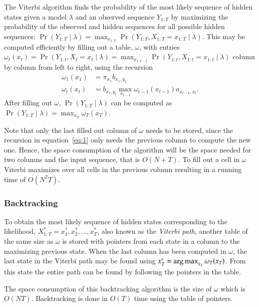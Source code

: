The Viterbi algorithm finds the probability of the most likely sequence of
hidden states given a model $\lambda$ and an observed sequence $Y_{1:T}$ by
maximizing the probability of the observed and hidden sequences for all
possible hidden sequences: $\Pr(Y_{1:T} \mid \lambda) = \max_{x_{1:T}}
\Pr(Y_{1:T}, X_{1:T} = x_{1:T} \mid \lambda)$. This may be computed efficiently
by filling out a table, $\omega$, with entries $\omega_t(x_t) = \Pr(Y_{1:t},
X_t = x_t \mid \lambda) = \max_{x_{1:t-1}} \Pr(Y_{1:t}, X_{1:t} = x_{1:t} \mid
\lambda)$ column by column from left to right, using the recursion
\begin{equation}
  \label{eq:1}
  \begin{aligned}
    \omega_1(x_1) &= \pi_{x_1} b_{x_1, y_1} \\
    \omega_t(x_t) &= b_{x_t, y_t} \max_{x_{t - 1}} \omega_{t - 1}(x_{t - 1})
    a_{x_{t - 1}, x_t}.
  \end{aligned}
\end{equation}
After filling out $\omega$, $\Pr(Y_{1:T} \mid \lambda)$ can be computed as
$\Pr(Y_{1:T} \mid \lambda) = \max_{x_T} \omega_T(x_T)$.

Note that only the last filled out column of $\omega$ needs to be stored, since
the recursion in equation~\eqref{eq:1} only needs the previous column to
compute the new one. Hence, the space consumption of the algorithm will be the
space needed for two columns and the input sequence, that is $O(N + T)$. To
fill out a cell in $\omega$ Viterbi maximizes over all cells in the previous
column resulting in a running time of $O(N^2 T)$.

\subsubsection{Backtracking}
\label{sec:backtracking-1}

To obtain the most likely sequence of hidden states corresponding to the
likelihood, $X_{1:T}^* = x_1^*, x_2^*, \dots, x_T^*$, also known as the
\emph{Viterbi path}, another table of the same size as $\omega$ is stored with
pointers from each state in a column to the maximizing previous state. When the
last column has been computed in $\omega$, the last state in the Viterbi path
may be found using $x_T^* = \operatorname*{arg\,max}_{x_T} \omega_T(x_T)$. From this state the entire
path can be found by following the pointers in the table.

The space consumption of this backtracking algorithm is the size of $\omega$
which is $O(N T)$. Backtracking is done in $O(T)$ time using the table of pointers.

